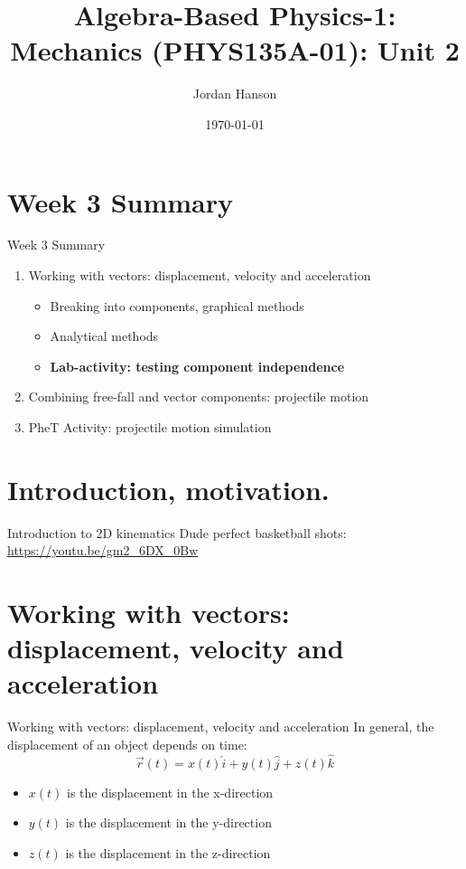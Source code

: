 \documentclass{beamer}
\title{Algebra-Based Physics-1: Mechanics (PHYS135A-01): Unit 2}
\date{\today}
\author{Jordan Hanson}
\institute{Whittier College Department of Physics and Astronomy}
\begin{document}
\maketitle

\section{Week 3 Summary}

\begin{frame}{Week 3 Summary}
\begin{enumerate}
\item Working with vectors: displacement, velocity and acceleration
\begin{itemize}
\item Breaking into components, graphical methods
\item Analytical methods
\item \textbf{Lab-activity: testing component independence}
\end{itemize}
\item Combining free-fall and vector components: \alert{projectile motion}
\item PheT Activity: projectile motion simulation
\end{enumerate}
\end{frame}

\section{Introduction, motivation.}

\begin{frame}{Introduction to 2D kinematics}
Dude perfect basketball shots:
\url{https://youtu.be/gm2_6DX_0Bw}
\end{frame}

\section{Working with vectors: displacement, velocity and acceleration}

\begin{frame}{Working with vectors: displacement, velocity and acceleration}
In general, the displacement of an object depends on time:
\begin{equation}
\vec{r}(t) = x(t) \hat{i} + y(t) \hat{j} + z(t) \hat{k}
\end{equation}
\begin{itemize}
\item $x(t)$ is the displacement in the x-direction
\item $y(t)$ is the displacement in the y-direction
\item $z(t)$ is the displacement in the z-direction
\end{itemize}
\end{frame}
\end{document}
